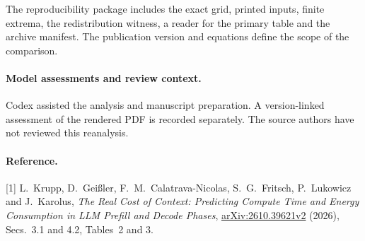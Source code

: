 \documentclass[11pt]{article}
\begin{document}
The reproducibility package includes the exact grid, printed inputs, finite extrema, the redistribution witness, a reader for the primary table and the archive manifest. The publication version and equations define the scope of the comparison.
\paragraph{Model assessments and review context.} Codex assisted the analysis and manuscript preparation. A version-linked assessment of the rendered PDF is recorded separately. The source authors have not reviewed this reanalysis.
\paragraph{Reference.} [1] L.~Krupp, D.~Gei{\ss}ler, F.~M.~Calatrava-Nicolas, S.~G.~Fritsch, P.~Lukowicz and J.~Karolus, \emph{The Real Cost of Context: Predicting Compute Time and Energy Consumption in LLM Prefill and Decode Phases}, \href{https://arxiv.org/abs/2610.39621v2}{arXiv:2610.39621v2} (2026), Secs.~3.1 and 4.2, Tables~2 and 3.
\end{document}
